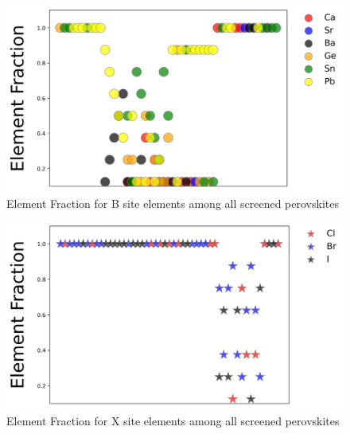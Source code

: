 \documentclass[twoside, twocolumn, 9pt, draft]{article}
\begin{document}
\begin{figure}
\centering
\includegraphics[width=.9\linewidth]{./expval/Element_BFrac.jpg}
\caption{\label{fig:sreened_frac_B} Element Fraction for B site elements among all screened perovskites}
\end{figure}

\begin{figure}
\centering
\includegraphics[width=.9\linewidth]{./expval/Element_XFrac.jpg}
\caption{\label{fig:sreened_frac_X} Element Fraction for X site elements among all screened perovskites}
\end{figure}
\end{document}
